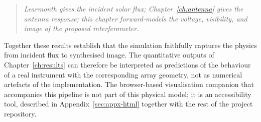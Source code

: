 \begin{quote}\itshape
Learmonth gives the incident solar flux; Chapter~\ref{ch:antenna} gives the
antenna response; this chapter forward-models the voltage, visibility, and
image of the proposed interferometer.
\end{quote}

Together these results establish that the simulation faithfully captures the
physics from incident flux to synthesised image. The quantitative outputs of
Chapter~\ref{ch:results} can therefore be interpreted as predictions of the
behaviour of a real instrument with the corresponding array geometry, not as
numerical artefacts of the implementation. The browser-based visualisation
companion that accompanies this pipeline is not part of this physical model;
it is an accessibility tool, described in
Appendix~\ref{sec:appx-html} together with the rest of the project
repository.
\clearpage
